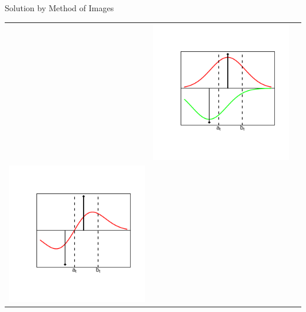 \documentclass{beamer}
\begin{document}
\begin{frame}{Solution by Method of Images}
\begin{centering}
\begin{tabular}{ccc}
&	

\begin{minipage}{0.3\textwidth}
	\includegraphics[scale=0.4,angle=0]{./section-2-figures/g0r0.pdf}
\end{minipage}
\vspace{-15mm}
\\\hspace{-10mm}
\pause

\begin{minipage}{0.3\textwidth}
	\includegraphics[scale=0.4,angle=0]{./section-2-figures/g1.pdf}
\end{minipage}
\pause


\end{tabular}
\end{centering}
\end{frame}
\end{document}
